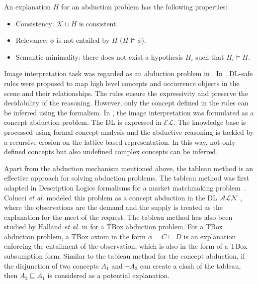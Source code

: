 \documentclass{article}
\begin{document}
An explanation $H$ for an abduction problem has the following properties: 
\begin{itemize}
  \item Consistency: $\mathcal{K}\cup H$ is consistent.
  \item Relevance: $\phi$ is not entailed by $H$ ($H\nvDash \phi$).
  \item Semantic minimality: there does not exist a hypothesis $H_i$ such that $H_i\vDash H$.
 \end{itemize}
Image interpretation task was regarded as an abduction problem in \cite{atif2014explanatory,gries2010probabilistic,neumann2008scene,shanahan2005perception}.
In \cite{neumann2008scene}, DL-safe rules were proposed to map high level concepts and occurrence objects in the scene and their relationships.
The rules ensure the expressivity and preserve the decidability of the reasoning. However, only the concept defined in the rules can be inferred using 
the formalism. In \cite{atif2014explanatory}, the image interpretation was formulated as a concept abduction problem.
The DL is expressed in $\mathcal{EL}$. The knowledge base is processed using formal concept analysis and the abductive reasoning is tackled
by a recursive erosion on the lattice based representation. In this way, not only defined concepts but also undefined complex concepts can be inferred.


Apart from the abduction mechanism mentioned above, the tableau method is an effective approach for solving abduction problems.
The tableau method was first adapted in Description Logics formalisms for a market matchmaking problem~\cite{colucci2004uniform}.
Colucci \textit{et al.} modeled this problem as a concept abduction in the DL $\mathcal{ALN}$ \cite{colucci2004uniform},
where the observations are the demand and the supply is treated as the explanation for the meet of the request.
The tableau method has also been studied by Halland \textit{et al.} in \cite{halland2014tbox} for a TBox abduction problem.
For a TBox abduction problem, a TBox axiom in the form $\phi= C\sqsubseteq D$ is an explanation enforcing the entailment of the observation,
which is also in the form of  a TBox subsumption form. Similar to the tableau method for the  concept abduction, if the disjunction of
two concepts $A_1$  and $\neg A_2$ can create a clash of the tableau, then $A_2 \sqsubseteq A_1$ is considered as a potential explanation.
\end{document}
